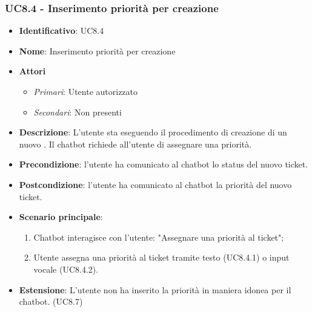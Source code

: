 \subsubsection{UC8.4 - Inserimento priorità per creazione }
\begin{itemize}
	\item \textbf{Identificativo}: UC8.4
	\item \textbf{Nome}: Inserimento priorità per creazione 
	\item \textbf{Attori}
	\begin{itemize} 
		\item \textit{Primari}: Utente autorizzato
		\item \textit{Secondari}: Non presenti
	\end{itemize}
	\item \textbf{Descrizione}: L'utente sta eseguendo il procedimento di creazione di un nuovo . Il chatbot richiede all'utente di assegnare una priorità.
	\item \textbf{Precondizione}: l'utente ha comunicato al chatbot lo status del nuovo ticket.
	\item \textbf{Postcondizione}: l'utente ha comunicato al chatbot la priorità del nuovo ticket.
	\item \textbf{Scenario principale}: \begin{enumerate}
		\item Chatbot interagisce con l'utente: "Assegnare una priorità al ticket";
		\item Utente assegna una priorità al ticket tramite testo (UC8.4.1) o input vocale (UC8.4.2).
	\end{enumerate}
	\item \textbf{Estensione}: L'utente non ha inserito la priorità in maniera idonea per il chatbot. (UC8.7)
\end{itemize}
